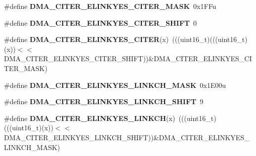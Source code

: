 \begin{DoxyCompactItemize}
\item 
\#define {\bfseries D\+M\+A\+\_\+\+C\+I\+T\+E\+R\+\_\+\+E\+L\+I\+N\+K\+Y\+E\+S\+\_\+\+C\+I\+T\+E\+R\+\_\+\+M\+A\+SK}~0x1\+F\+Fu\hypertarget{group__DMA__Register__Masks_ga6d3dc490db41703ee3444ab83abd49fc}{}\label{group__DMA__Register__Masks_ga6d3dc490db41703ee3444ab83abd49fc}

\item 
\#define {\bfseries D\+M\+A\+\_\+\+C\+I\+T\+E\+R\+\_\+\+E\+L\+I\+N\+K\+Y\+E\+S\+\_\+\+C\+I\+T\+E\+R\+\_\+\+S\+H\+I\+FT}~0\hypertarget{group__DMA__Register__Masks_ga73c42915d2235324c9b45698eabb87b4}{}\label{group__DMA__Register__Masks_ga73c42915d2235324c9b45698eabb87b4}

\item 
\#define {\bfseries D\+M\+A\+\_\+\+C\+I\+T\+E\+R\+\_\+\+E\+L\+I\+N\+K\+Y\+E\+S\+\_\+\+C\+I\+T\+ER}(x)~(((uint16\+\_\+t)(((uint16\+\_\+t)(x))$<$$<$D\+M\+A\+\_\+\+C\+I\+T\+E\+R\+\_\+\+E\+L\+I\+N\+K\+Y\+E\+S\+\_\+\+C\+I\+T\+E\+R\+\_\+\+S\+H\+I\+FT))\&D\+M\+A\+\_\+\+C\+I\+T\+E\+R\+\_\+\+E\+L\+I\+N\+K\+Y\+E\+S\+\_\+\+C\+I\+T\+E\+R\+\_\+\+M\+A\+SK)\hypertarget{group__DMA__Register__Masks_ga1175f3bd26aae1cad208710bdef5c4d4}{}\label{group__DMA__Register__Masks_ga1175f3bd26aae1cad208710bdef5c4d4}

\item 
\#define {\bfseries D\+M\+A\+\_\+\+C\+I\+T\+E\+R\+\_\+\+E\+L\+I\+N\+K\+Y\+E\+S\+\_\+\+L\+I\+N\+K\+C\+H\+\_\+\+M\+A\+SK}~0x1\+E00u\hypertarget{group__DMA__Register__Masks_ga2cd979a0efa9045304d49655f57747ef}{}\label{group__DMA__Register__Masks_ga2cd979a0efa9045304d49655f57747ef}

\item 
\#define {\bfseries D\+M\+A\+\_\+\+C\+I\+T\+E\+R\+\_\+\+E\+L\+I\+N\+K\+Y\+E\+S\+\_\+\+L\+I\+N\+K\+C\+H\+\_\+\+S\+H\+I\+FT}~9\hypertarget{group__DMA__Register__Masks_ga2c85ee95c023b3a2705bc1b393d8261e}{}\label{group__DMA__Register__Masks_ga2c85ee95c023b3a2705bc1b393d8261e}

\item 
\#define {\bfseries D\+M\+A\+\_\+\+C\+I\+T\+E\+R\+\_\+\+E\+L\+I\+N\+K\+Y\+E\+S\+\_\+\+L\+I\+N\+K\+CH}(x)~(((uint16\+\_\+t)(((uint16\+\_\+t)(x))$<$$<$D\+M\+A\+\_\+\+C\+I\+T\+E\+R\+\_\+\+E\+L\+I\+N\+K\+Y\+E\+S\+\_\+\+L\+I\+N\+K\+C\+H\+\_\+\+S\+H\+I\+FT))\&D\+M\+A\+\_\+\+C\+I\+T\+E\+R\+\_\+\+E\+L\+I\+N\+K\+Y\+E\+S\+\_\+\+L\+I\+N\+K\+C\+H\+\_\+\+M\+A\+SK)\hypertarget{group__DMA__Register__Masks_ga33cdcc8c02ec5cf42a01b86c0c2c6b52}{}\label{group__DMA__Register__Masks_ga33cdcc8c02ec5cf42a01b86c0c2c6b52}


\end{DoxyCompactItemize}
